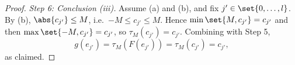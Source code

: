 \begin{proof}
  \emph{Step 6: Conclusion (iii).} Assume (a) and (b), and fix $j' \in \set{0,\dots,l}$. By (b),
  $\abs{c_{j'}} \le M$, i.e.\ $-M \le c_{j'} \le M$. Hence $\min\set{M,c_{j'}} = c_{j'}$ and then
  $\max\set{-M,c_{j'}} = c_{j'}$, so $\tau_M(c_{j'}) = c_{j'}$. Combining with Step 5,
  \[
    g(e_{j'}) = \tau_M(F(e_{j'})) = \tau_M(c_{j'}) = c_{j'}
    ,
  \]
  as claimed.
\end{proof}
